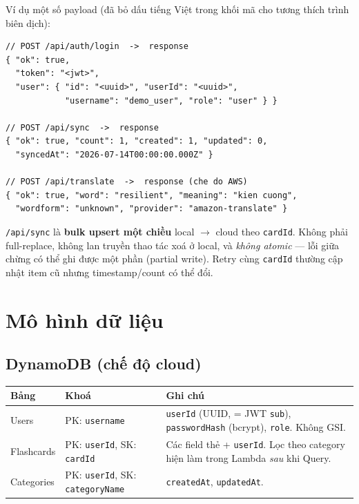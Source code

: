 \documentclass[11pt,a4paper]{article}
\newcommand{\code}[1]{\texttt{#1}}
\begin{document}
\noindent Ví dụ một số payload (đã bỏ dấu tiếng Việt trong khối mã cho tương thích trình biên dịch):

\begin{lstlisting}
// POST /api/auth/login  ->  response
{ "ok": true,
  "token": "<jwt>",
  "user": { "id": "<uuid>", "userId": "<uuid>",
            "username": "demo_user", "role": "user" } }

// POST /api/sync  ->  response
{ "ok": true, "count": 1, "created": 1, "updated": 0,
  "syncedAt": "2026-07-14T00:00:00.000Z" }

// POST /api/translate  ->  response (che do AWS)
{ "ok": true, "word": "resilient", "meaning": "kien cuong",
  "wordform": "unknown", "provider": "amazon-translate" }
\end{lstlisting}

\begin{note}
\code{/api/sync} là \textbf{bulk upsert một chiều} local $\rightarrow$ cloud theo \code{cardId}.
Không phải full-replace, không lan truyền thao tác xoá ở local, và \emph{không atomic} — lỗi
giữa chừng có thể ghi được một phần (partial write). Retry cùng \code{cardId} thường cập nhật item
cũ nhưng timestamp/count có thể đổi.
\end{note}

\section{Mô hình dữ liệu}

\subsection{DynamoDB (chế độ cloud)}
\begin{longtable}{@{}p{3.1cm} p{4.6cm} p{7.3cm}@{}}
\toprule
\textbf{Bảng} & \textbf{Khoá} & \textbf{Ghi chú} \\
\midrule
\endhead
Users & PK: \code{username} & \code{userId} (UUID, = JWT \code{sub}), \code{passwordHash} (bcrypt), \code{role}. Không GSI. \\
\addlinespace
Flashcards & PK: \code{userId}, SK: \code{cardId} & Các field thẻ + \code{userId}. Lọc theo category hiện làm trong Lambda \emph{sau} khi Query. \\
\addlinespace
Categories & PK: \code{userId}, SK: \code{categoryName} & \code{createdAt}, \code{updatedAt}. \\
\bottomrule
\end{longtable}
\end{document}
